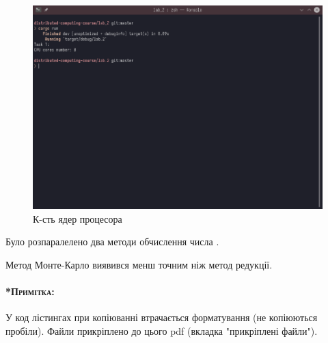 \documentclass{udstu}
\begin{document}
\begin{figure}[!htp]
	\centering
	\includegraphics[scale=0.5]{PNG/thread-num-test.png}
	\caption{К-сть ядер процесора}
	\label{fig:figure1}
\end{figure}

\begin{center}
\end{center}

\conclusions

Було розпаралелено два методи обчислення числа \pi.

Метод Монте-Карло виявився менш точним ніж метод редукції.


\paragraph{\textsc{*Примітка:}}
У код лістингах при копіюванні втрачається форматування (не копіюються пробіли).
Файли прикріплено до цього pdf (вкладка "прикріплені файли").

\inputminted{rust}{../src/constcalc.rs}

\inputminted{rust}{../src/lib.rs}

\inputminted{rust}{../src/main.rs}
\end{document}
